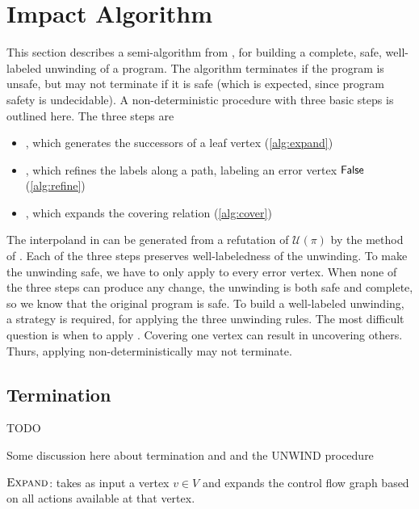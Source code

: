 \section{Impact Algorithm}
\label{sec:impact-algorithm}
%

This section describes a semi-algorithm from \cite{mcmillan06}, for building a complete, safe, well-labeled unwinding of a program. The algorithm terminates if the program is unsafe, but may not terminate if it is safe (which is expected, since program safety is undecidable). A non-deterministic procedure with three basic steps is outlined here. The three steps are

\begin{itemize}
  \item \expand, which generates the successors of a leaf vertex (\autoref{alg:expand})
  \item {}, which refines the labels along a path, labeling an error vertex $\mathsf{False}$ (\autoref{alg:refine})
  \item \cover, which expands the covering relation (\autoref{alg:cover})
\end{itemize}

The interpoland in  can be generated from a refutation of $\mathcal{U}(\pi)$ by the method of \cite{mcmillan05}. Each of the three steps preserves well-labeledness of the unwinding. To make the unwinding safe, we have to only apply  to every error vertex. When none of the three steps can produce any change, the unwinding is both safe and complete, so we know that the original program is safe.
To build a well-labeled unwinding, a strategy is required, for applying the three unwinding rules. The most difficult question is when to apply \cover. Covering one vertex can result in uncovering others. Thurs, applying \cover non-deterministically may not terminate.

\subsection{Termination}
TODO

Some discussion here about termination and and the UNWIND procedure

\begin{algorithm}[ht]


  \caption{$\textsc{Expand}$: takes as input a vertex $v \in V$ and expands the control flow graph based on all actions available at that vertex.}
  \label{alg:expand}
\end{algorithm}

